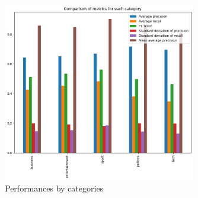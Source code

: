 \begin{figure}[H]
    \centering
    \includegraphics[width=0.75\textwidth]{images/class_comparison.png}
    \caption{Performances by categories}
    \label{fig:Performances_cat}
\end{figure}


